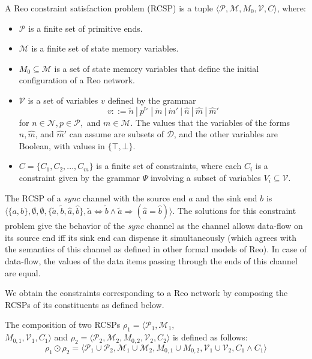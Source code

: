 \begin{definition} A Reo constraint satisfaction problem (RCSP) is a tuple $\langle \mathcal{P}, \mathcal{M}, M_0, \mathcal{V}, C \rangle$, where:
\begin{itemize}
\item $\mathcal{P}$ is a finite set of primitive ends.
\item $\mathcal{M}$ is a finite set of state memory variables.
\item $M_0 \subseteq \mathcal{M}$ is a set of state memory variables that define the initial configuration of a Reo network.
\item $\mathcal{V}$ is a set of variables $v$ defined by the grammar $$v ::= \tilde{n}\ |\ p^\triangleright\ |\ \mathring{m}\ |\ \mathring{m}'\ |\   \hat{n}\ |\ \hat{m}\ |\ \hat{m}'$$ for $n \in \mathcal{N}, p \in \mathcal{P},$ and $m \in \mathcal{M}$. The values that the variables of the forms $ \hat{n}, \hat{m} $, and $ \hat{m}' $ can assume are subsets of $\mathcal{D}$, and the other variables are Boolean, with values in $\{\top, \bot\}$.
 \item $C=\{C_1, C_2, ..., C_m\}$ is a finite set of constraints, where each $C_i$ is a constraint given by the grammar $\Psi$ involving a subset of variables $V_i \subseteq \mathcal{V}$.
\end{itemize}
\end{definition} 

\begin{BehExample}
\label{ex:rcspmesal}
The RCSP of a \emph{sync} channel with the source end $a$ and the sink end $b$ is $\langle \{a, b\}, \emptyset, \emptyset, \{\tilde{a}, \tilde{b}, \hat{a}, \hat{b}\}, \tilde{a} \Leftrightarrow \tilde{b} \wedge \tilde{a} \Rightarrow (\hat{a}=\hat{b})\rangle$. The solutions for this constraint problem give the behavior of the \emph{sync} channel as the channel allows data-flow on its source end iff its sink end can dispense it simultaneously (which agrees with the semantics of this channel as defined in other formal models of Reo). In case of data-flow, the values of the data items passing through the ends of this channel are equal.
\end{BehExample}

We obtain the constraints corresponding to a Reo network by composing the RCSPs of its constituents as defined below.
\begin{definition}[Composition]
\label{def:composition}
The composition of two RCSPs $\rho_1=\langle \mathcal{P}_1, \mathcal{M}_1,$\\$ M_{0,1}, \mathcal{V}_1, C_1 \rangle$ and $\rho_2=\langle \mathcal{P}_2, \mathcal{M}_2, M_{0,2}, \mathcal{V}_2, C_2 \rangle$ is defined as follows:
$$\rho_1 \odot \rho_2=\langle \mathcal{P}_1 \cup \mathcal{P}_2, \mathcal{M}_1 \cup \mathcal{M}_2, M_{0,1} \cup M_{0,2}, \mathcal{V}_1 \cup \mathcal{V}_2, C_1 \wedge C_1 \rangle$$
\end{definition}

